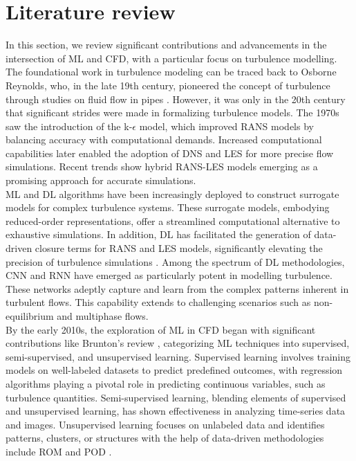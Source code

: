 \section{Literature review}
In this section, we review significant contributions and advancements in the intersection of ML and \gls{CFD}, with a particular focus on turbulence modelling. The foundational work in turbulence modeling can be traced back to Osborne Reynolds, who, in the late 19th century, pioneered the concept of turbulence through studies on fluid flow in pipes \cite{reynolds1895dynamical}. However, it was only in the 20th century that significant strides were made in formalizing turbulence models. The 1970s saw the introduction of the k-$\epsilon$ \cite{launder1974application} model, which improved RANS models by balancing accuracy with computational demands. Increased computational capabilities later enabled the adoption of \gls{DNS} and \gls{LES} \cite{smagorinsky1963general} for more precise flow simulations. Recent trends show hybrid RANS-LES models emerging as a promising approach for accurate simulations.\\
ML and DL algorithms have been increasingly deployed to construct surrogate models for complex turbulence systems. These surrogate models, embodying reduced-order representations, offer a streamlined computational alternative to exhaustive simulations. In addition, DL has facilitated the generation of data-driven closure terms for RANS and LES models, significantly elevating the precision of turbulence simulations \cite{ling2016}. Among the spectrum of DL methodologies, \gls{CNN} and \gls{RNN} have emerged as particularly potent in modelling turbulence. These networks adeptly capture and learn from the complex patterns inherent in turbulent flows. This capability extends to challenging scenarios such as non-equilibrium and multiphase flows. \\   
By the early 2010s, the exploration of ML in CFD began with significant contributions like Brunton's review \cite{brunton}, categorizing ML techniques into supervised, semi-supervised, and unsupervised learning. Supervised learning involves training models on well-labeled datasets to predict predefined outcomes, with regression algorithms playing a pivotal role in predicting continuous variables, such as turbulence quantities. Semi-supervised learning, blending elements of supervised and unsupervised learning, has shown effectiveness in analyzing time-series data and images. Unsupervised learning focuses on unlabeled data and identifies patterns, clusters, or structures with the help of data-driven methodologies include ROM and POD \cite{berkooz1993proper}.\\
